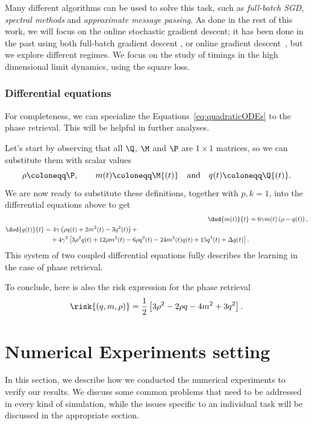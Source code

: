 Many different algorithms can be used to solve this task, such as 
\emph{full-batch SGD}\cite{mignacco2021stochasticity},
\emph{spectral methods}\cite{mondelli2018fundamental} and 
\emph{approximate message passing}\cite{maillard2020phase}.
As done in the rest of this work, we will focus on the online stochastic gradient descent;
it has been done in the past using both full-batch gradient descent \cite{sarao2020complex,sarao2020optimization},
or online gradient descent~\cite{tan2019online}, but we explore different regimes.
We focus on the study of timings in the high dimensional limit dynamics,
using the square loss.

\subsubsection{Differential equations}
For completeness, we can specialize the Equations~\eqref{eq:quadraticODEs} to the phase retrieval.
This will be helpful in further analyses.

Let's start by observing that all \(\Q\), \(\M\) and \(\P\) are \(1\times 1\) matrices,
so we can substitute them with scalar values
\[\rho \coloneqq \P, \qquad m{(t)}\coloneqq\M{(t)}\quad\text{and}\quad q{(t)}\coloneqq\Q{(t)}.\]
We are now ready to substitute these definitions, together with \(p,k = 1\), into the differential
equations above to get
\begin{subequations}\label{eq:phase_retrieval}\begin{align}
  \dod{m{(t)}}{t} &= 6 \gamma m{(t)} \left(\rho-q{(t)}\right), \\
  \begin{split}
    \dod{q{(t)}}{t} &= 4 \gamma\left(
        \rho q{(t)} + 2m^2{(t)} - 3q^2{(t)}
    \right) +\\
    &\quad+4 \gamma^2 \left[
      3\rho^2q{(t)} + 12\rho m^2{(t)} -6\rho q^2{(t)} -24m^2{(t)}q{(t)} + 15q^3{(t)} + \Delta q{(t)}\right].
  \end{split}
\end{align}\end{subequations}
This system of two coupled differential equations fully describes the learning in the case of phase retrieval.

To conclude, here is also the risk expression for the phase retrieval
\begin{equation}
  \risk{(q,m,\rho)} = \frac12\left[3\rho^2-2\rho q - 4m^2 + 3q^2\right].
\end{equation}

\section{Numerical Experiments setting}
In this section, we describe how we conducted the numerical experiments to verify 
our results. We discuss some common problems that need to be addressed in every kind of simulation,
while the issues specific to an individual task will be discussed in the appropriate section.


